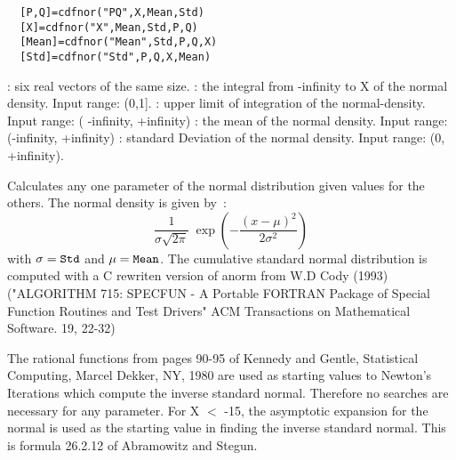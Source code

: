 \begin{mandesc}
\end{mandesc}
\label{cdfnor}
\begin{calling_sequence}
\begin{verbatim}
  [P,Q]=cdfnor("PQ",X,Mean,Std)  
  [X]=cdfnor("X",Mean,Std,P,Q)  
  [Mean]=cdfnor("Mean",Std,P,Q,X)  
  [Std]=cdfnor("Std",P,Q,X,Mean)  
\end{verbatim}
\end{calling_sequence}
\begin{parameters}
  \begin{varlist}
    : six real vectors of the same size.
    : the integral from -infinity to X of the normal density. Input range: (0,1].
      : upper limit of integration of the normal-density. Input range: ( -infinity, +infinity)
      : the mean of the normal density. Input range: (-infinity, +infinity)
      : standard Deviation of the normal density. Input range: (0, +infinity).
  \end{varlist}
\end{parameters}
\begin{mandescription}
  Calculates any one parameter of the normal distribution given values for the others.
  The normal density is given by~:
  \begin{equation}
    \frac{1}{\sigma\sqrt{2\pi}} \; \exp\left(-\frac{\left(x-\mu\right)^2}{2\sigma^2} \right)
  \end{equation} 
  with $\sigma = \mbox{\tt Std}$ and $\mu = \mbox{\tt Mean}$.
  The  cumulative standard normal distribution is computed with a C rewriten version of 
  anorm from W.D Cody (1993) ("ALGORITHM 715: SPECFUN - A Portable FORTRAN
  Package of Special Function Routines and Test Drivers" ACM Transactions on Mathematical Software. 19, 22-32) 

  The rational functions from pages  90-95  of Kennedy and Gentle,
  Statistical  Computing,  Marcel  Dekker, NY,  1980 are  used  as
  starting values to Newton's Iterations which compute the inverse
  standard normal.  Therefore no  searches  are necessary for  any
  parameter. 
  For X $<$ -15, the asymptotic expansion for the normal is used  as
  the starting value in finding the inverse standard normal.
  This is formula 26.2.12 of Abramowitz and Stegun.
\end{mandescription}

